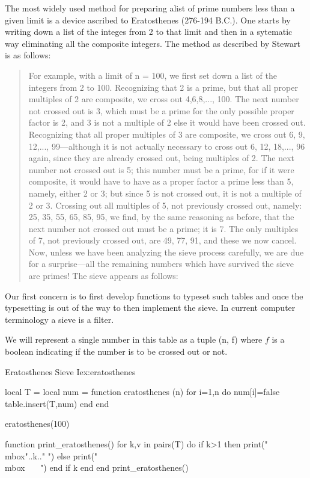 The most widely used method for preparing alist of prime numbers less than a given limit is a device ascribed to Eratosthenes (276-194 B.C.). One starts  by writing down a list of the integes from 2 to that limit and then in a sytematic way eliminating all the composite integers. The method as described by Stewart is as follows:

\begin{quotation}
For example, with a limit of n = 100, we first set down a list of the 
integers from 2 to 100. Recognizing that 2 is a prime, but that all proper 
multiples of 2 are composite, we cross out 4,6,8,..., 100. The next number 
not crossed out is 3, which must be a prime for the only possible proper 
factor is 2, and 3 is not a multiple of 2 else it would have been crossed out. 
Recognizing that all proper multiples of 3 are composite, we cross out 
6, 9, 12,..., 99—although it is not actually necessary to cross out 6, 12, 
18,..., 96 again, since they are already crossed out, being multiples of 2. 
The next number not crossed out is 5; this number must be a prime, for if 
it were composite, it would have to have as a proper factor a prime less 
than 5, namely, either 2 or 3; but since 5 is not crossed out, it is not a 
multiple of 2 or 3. Crossing out all multiples of 5, not previously crossed 
out, namely: 25, 35, 55, 65, 85, 95, we find, by the same reasoning as 
before, that the next number not crossed out must be a prime; it is 7. 
The only multiples of 7, not previously crossed out, are 49, 77, 91, and 
these we now cancel. Now, unless we have been analyzing the sieve process 
carefully, we are due for a surprise—all the remaining numbers which 
have survived the sieve are primes! The sieve appears as follows: 
\end{quotation}

Our first concern is to first develop functions to typeset such tables and once the
typesetting is out of the way to then implement the sieve. In current computer terminology
a sieve is a filter.

We will represent a single number in this table as a tuple (n, f) where $f$ is a boolean indicating if the
number is to be crossed out or not.

\begin{texexample}{Eratosthenes Sieve I}{ex:eratosthenes}
\begin{luacode}
local T = {}
local num = {}
function eratosthenes (n)
   for i=1,n do
     num[i]=false
     table.insert(T,num)
   end
end

eratosthenes(100)

function print_eratosthenes()
  for k,v in pairs(T) do
    if k>1 then print("\\mbox{"..k.."} ") 
    else
      print("\\mbox{~~~} ")
    end
    if k%
  end
end  
print_eratosthenes()
\end{luacode}
\end{texexample}

